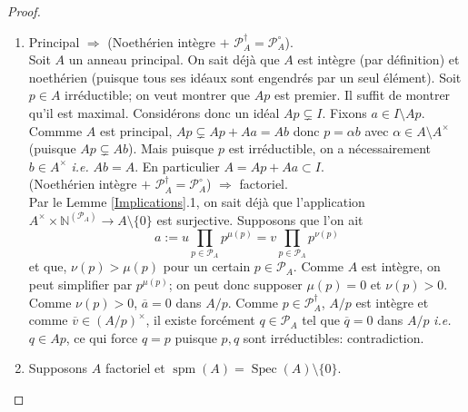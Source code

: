 \documentclass[a4paper, oneside, 12pt]{book}
\theoremstyle{theoremeStyle} %
\theoremstyle{definition} %
\newcommand{\ie}{\textit{i.e.}} %
\DeclareMathOperator{\Spec}{Spec}
\DeclareMathOperator{\spm}{spm}
\newcommand{\N}{\mathbb{N}}
\begin{document}
\begin{proof} \begin{enumerate}[leftmargin=* ,parsep=0cm,itemsep=0cm,topsep=0cm]
\item  Principal $\Rightarrow$ (Noethérien intègre $+$ $\mathcal{P}_A^\dag=\mathcal{P}_A^\circ$). \\

 Soit $A$ un anneau principal. On sait déjà que  $A$ est  intègre (par définition) et  noethérien (puisque tous ses idéaux sont engendrés par un seul élément). Soit $p\in A $ irréductible; on veut montrer que $ Ap$ est premier. Il suffit de montrer qu'il est maximal. Considérons donc un idéal $Ap\subsetneq I $. Fixons $a\in I\setminus Ap$. Commme $A$ est principal, $Ap\subsetneq Ap+Aa=Ab$ donc $p=\alpha b$ avec $\alpha\in A\setminus A^\times$ (puisque $Ap\subsetneq Ab$). Mais puisque $p$ est irréductible, on a nécessairement $b\in A^\times$ \ie{} $Ab=A$. En particulier $A=Ap+Aa \subset I$.\\

 (Noethérien intègre $+$ $\mathcal{P}_A^\dag=\mathcal{P}_A^\circ$) $\Rightarrow$ factoriel.\\

 Par le Lemme \ref{Implications}.1, on sait déjà que l'application $A^\times\times \N^{(\mathcal{P}_A)} \rightarrow A\setminus\lbrace 0\rbrace $ est surjective.
Supposons que
l'on ait $$a:=u\prod_{p\in \mathcal{P}_A}p^{\mu(p)}=v\prod_{p\in \mathcal{P}_A}p^{\nu(p)}$$
et que, $\nu(p)>\mu(p)$ pour un certain $p\in \mathcal{P}_A$. Comme $A$ est intègre, on peut simplifier par $p^{\mu(p)}$; on peut donc supposer $\mu(p)=0$ et $\nu(p)>0$. Comme $\nu(p)>0$, $\overline{a}=0$  dans $A/p$. Comme $p\in \mathcal{P}_A^\dag$,  $A/p$ est intègre et comme $\overline{v}\in (A/p)^\times$, il existe forcément $q\in \mathcal{P}_A$ tel que $\overline{q}=0 $ dans $A/p$ \ie{} $q\in Ap$, ce qui force $q=p$ puisque $p,q$ sont irréductibles: contradiction.\\

\item Supposons   $A$ factoriel et $\spm(A)= \Spec(A)\setminus \lbrace 0\rbrace$.\\


\end{enumerate}
\end{proof}
\end{document}
